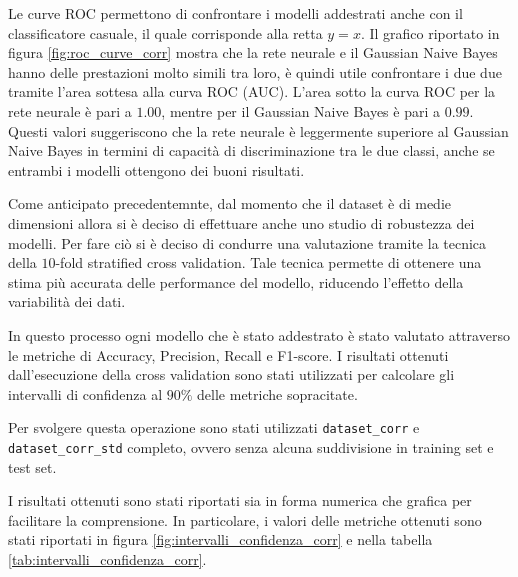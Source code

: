 Le curve ROC permettono di confrontare i modelli addestrati anche con il classificatore
casuale, il quale corrisponde alla retta $y = x$. Il grafico riportato in figura
\ref{fig:roc_curve_corr} mostra che la rete neurale e il Gaussian Naive Bayes
hanno delle prestazioni molto simili tra loro, è quindi utile confrontare i due
due tramite l'area sottesa alla curva ROC (AUC). L'area sotto la curva ROC
per la rete neurale è pari a $1.00$, mentre per il Gaussian Naive Bayes è pari a
$0.99$. Questi valori suggeriscono che la rete neurale è leggermente superiore
al Gaussian Naive Bayes in termini di capacità di discriminazione tra le due
classi, anche se entrambi i modelli ottengono dei buoni risultati.

Come anticipato precedentemnte, dal momento che il dataset è di medie dimensioni
allora si è deciso di effettuare anche uno studio di robustezza dei modelli.
Per fare ciò si è deciso di condurre una valutazione tramite la tecnica della
$10$-fold stratified cross validation. Tale tecnica permette di ottenere una
stima più accurata delle performance del modello, riducendo l'effetto della
variabilità dei dati.

In questo processo ogni modello che è stato addestrato è stato valutato attraverso
le metriche di Accuracy, Precision, Recall e F1-score. I risultati ottenuti
dall'esecuzione della cross validation sono stati utilizzati per calcolare gli
intervalli di confidenza al $90\%$ delle metriche sopracitate.

Per svolgere questa operazione sono stati utilizzati \texttt{dataset\_corr} e 
\texttt{dataset\_corr\_std} completo, ovvero senza alcuna suddivisione in training 
set e test set.

I risultati ottenuti sono stati riportati sia in forma numerica che grafica
per facilitare la comprensione. In particolare, i valori delle metriche ottenuti
sono stati riportati in figura \ref{fig:intervalli_confidenza_corr} e
nella tabella \ref{tab:intervalli_confidenza_corr}.

